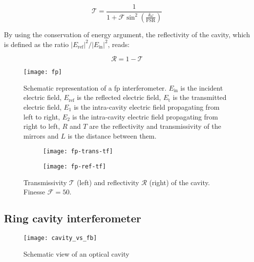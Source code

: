 \begin{equation}
	\mathcal{T} = \frac{1}{1+\mathcal{F}\sin^2{\left(\frac{\delta \omega}{\text{FSR}}\right)}}
\end{equation}

By using the conservation of energy argument, the reflectivity of the cavity, which is defined as the ratio $|E_{\text{ref}}|^2/|E_{\text{in}}|^2$, reads:

\begin{equation}
	\mathcal{R} = 1 - \mathcal{T}
\end{equation}



\begin{figure}[h]
	\centering
	\texttt{[image: fp]}
	\caption{Schematic representation of a \acrlong{fp} interferometer. $E_{\text{in}}$ is the incident electric field, $E_{\text{ref}}$ is the reflected electric field, $E_{\text{t}}$ is the transmitted electric field, $E_{1}$ is the intra-cavity electric field propagating from left to right, $E_{2}$ is the intra-cavity electric field propagating from right to left, $R$ and $T$ are the reflectivity and transmissivity of the mirrors and $L$ is the distance between them.}
	\label{fp}
\end{figure}

\begin{figure}[h]
	\centering
	\begin{subfigure}{.5\textwidth}
		\centering
		\texttt{[image: fp-trans-tf]}
	\end{subfigure}%
	\begin{subfigure}{.5\textwidth}
		\centering
		\texttt{[image: fp-ref-tf]}
	\end{subfigure}
	\caption{Transmissivity $\mathcal{T}$ (left) and reflectivity $\mathcal{R}$ (right) of the cavity. Finesse $\mathcal{F}=50$. }
	\label{fp-tf}
\end{figure}


\subsection{Ring cavity interferometer}

\begin{figure}[h]
	\centering
	\texttt{[image: cavity\_vs\_fb]}
	\caption{Schematic view of an optical cavity}
\end{figure}

